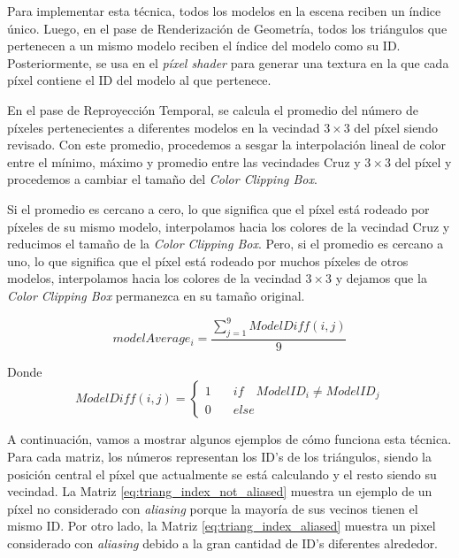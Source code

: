 \documentclass[pregrado]{tesis-usb} %
\begin{document}
Para implementar esta técnica, todos los modelos en la escena reciben un índice único. Luego, en el pase de Renderización de Geometría, todos los triángulos que pertenecen a un mismo modelo reciben el índice del modelo como su ID. Posteriormente, se usa en el \textit{píxel shader} para generar una textura en la que cada píxel contiene el ID del modelo al que pertenece.

En el pase de Reproyección Temporal, se calcula el promedio del número de píxeles pertenecientes a diferentes modelos en la vecindad $3\times 3$ del píxel siendo revisado. Con este promedio, procedemos a sesgar la interpolación lineal de color entre el mínimo, máximo y promedio entre las vecindades Cruz y $3\times 3$ del píxel y procedemos a cambiar el tamaño del \textit{Color Clipping Box}.

Si el promedio es cercano a cero, lo que significa que el píxel está rodeado por píxeles de su mismo modelo, interpolamos hacia los colores de la vecindad Cruz y reducimos el tamaño de la \textit{Color Clipping Box}. Pero, si el promedio es cercano a uno, lo que significa que el píxel está rodeado por muchos píxeles de otros modelos, interpolamos hacia los colores de la vecindad $3\times 3$ y dejamos que la \textit{Color Clipping Box} permanezca en su tamaño original.

\begin{equation}\label{eq:model_index_acc}
modelAverage_i = \frac{\sum\limits_{j=1}^{9} ModelDiff(i,j)}{9} 
\end{equation}

Donde
\begin{equation*}
ModelDiff(i,j) = \left\lbrace \begin{split}1\quad & if\quad ModelID_i \neq ModelID_j \\ 0\quad & else\end{split} \right.
\end{equation*}

A continuación, vamos a mostrar algunos ejemplos de cómo funciona esta técnica. Para cada matriz, los números representan los ID’s de los triángulos, siendo la posición central el píxel que actualmente se está calculando y el resto siendo su vecindad. La Matriz \ref{eq:triang_index_not_aliased} muestra un ejemplo de un píxel no considerado con \textit{aliasing} porque la mayoría de sus vecinos tienen el mismo ID. Por otro lado, la Matriz \ref{eq:triang_index_aliased} muestra un pixel considerado con \textit{aliasing} debido a la gran cantidad de ID’s diferentes alrededor.
\end{document}
